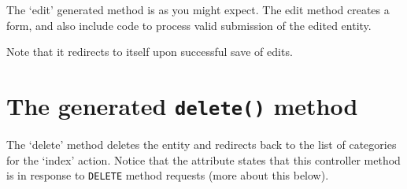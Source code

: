 \documentclass[a4paperpaper,openright]{book}
\newenvironment{Shaded}{}{}
\newcommand{\CommentTok}[1]{\textcolor[rgb]{0.38,0.63,0.69}{\textit{#1}}}
\newcommand{\KeywordTok}[1]{\textcolor[rgb]{0.00,0.44,0.13}{\textbf{#1}}}
\newcommand{\NormalTok}[1]{#1}
\newcommand{\OtherTok}[1]{\textcolor[rgb]{0.00,0.44,0.13}{#1}}
\newcommand{\StringTok}[1]{\textcolor[rgb]{0.25,0.44,0.63}{#1}}
\begin{document}
The `edit' generated method is as you might expect. The edit method
creates a form, and also include code to process valid submission of the
edited entity.

Note that it redirects to itself upon successful save of edits.

\begin{Shaded}
\end{Shaded}

\hypertarget{the-generated-delete-method}{%
\section{\texorpdfstring{The generated \texttt{delete()}
method}{The generated delete() method}}\label{the-generated-delete-method}}

The `delete' method deletes the entity and redirects back to the list of
categories for the `index' action. Notice that the attribute states that
this controller method is in response to \texttt{DELETE} method requests
(more about this below).
\end{document}
